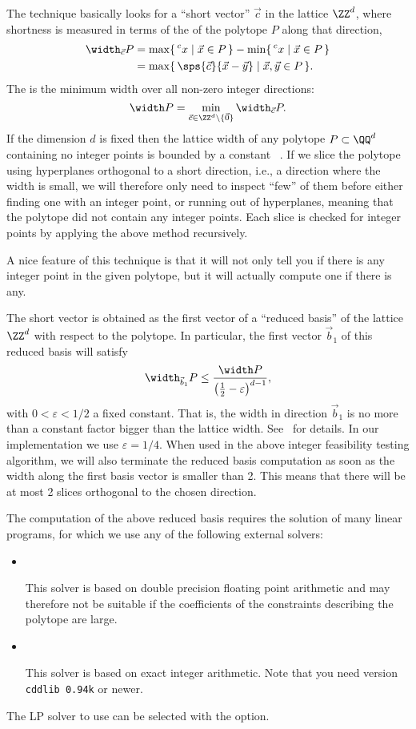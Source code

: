 The technique basically looks for a ``short vector'' $\vec c$ in the
lattice $\ZZ^d$, where shortness is measured in terms of
the  of the polytope $P$ along that direction,
\begin{align*}
\width_{\vec c} P
& =
\max \{\, \sp c x \mid \vec x \in P \,\}
-
\min \{\, \sp c x \mid \vec x \in P \,\}
\\
& =
\max \{\, \sps {\vec c} {\vec x - \vec y} \mid \vec x, \vec y \in P \,\}
.
\end{align*}
The  is the minimum width over all
non-zero integer directions:
$$
\width P =
\min_{\vec c \in \ZZ^d \setminus \{ \vec 0 \} } \width_{\vec c} P
.
$$
If the dimension $d$ is fixed then
the lattice width of any polytope $P \subset \QQ^d$
containing no integer points is bounded by a constant%
~.
If we slice the polytope using hyperplanes orthogonal
to a short direction, i.e., a direction where the width
is small, we will therefore only need to inspect
``few'' of them before either finding one with an integer point,
or running out of hyperplanes, meaning that the
polytope did not contain any integer points.
Each slice is checked for integer points by applying
the above method recursively.

A nice feature of this technique is that it will
not only tell you if there is any integer point
in the given polytope, but it will actually compute
one if there is any.

The short vector is obtained as the first vector
of a ``reduced basis'' of the lattice $\ZZ^d$ with respect
to the polytope.
In particular, the first vector $\vec b_1$ of this reduced basis
will satisfy
$$
\width_{\vec b_1} P
\le
\frac{\width P}
{\left(\frac 1 2 - \varepsilon\right)^{d-1}}
,
$$
with $0 < \varepsilon < 1/2$ a fixed constant.
That is, the width in direction $\vec b_1$ is no more than a constant
factor bigger than the lattice width.
See~ for details.
In our implementation we use $\varepsilon = 1/4$.
When used in the above integer feasibility testing algorithm,
we will also terminate the reduced basis computation
as soon as the width along the first basis vector is smaller than 2.
This means that there will be at most 2 slices orthogonal to the chosen
direction.

The computation of the above reduced basis requires the solution
of many linear programs, for which we use any of the following
external solvers:
\begin{itemize}
\item {}~

This solver is based on double precision floating point arithmetic and
may therefore not be suitable if the coefficients of the constraints
describing the polytope are large.

\item {}~

This solver is based on exact integer arithmetic.
Note that you need version \verb+cddlib 0.94k+ or newer.

\end{itemize}
The LP solver to use can be selected with the  option.


